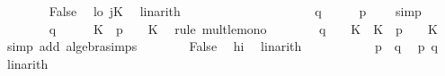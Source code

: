 \begin{isabellebody}
\ \ \ \ \ \ \isamarkupfalse%
\ False\ \isamarkupfalse%
\ lo\ jK\ \isamarkupfalse%
\ linarith\isanewline
\ \ \ \ \isamarkupfalse%
\isanewline
\ \ \ \ \ \ \isamarkupfalse%
\ {}\isanewline
\ \ \ \ \ \ \isamarkupfalse%
\ {\isachardoublequoteopen}{\isacharparenleft}{\kern0pt}q\ {\isacharminus}{\kern0pt}\ {}{\isacharparenright}{\kern0pt}\ {\isacharplus}{\kern0pt}\ {}\ {\isasymle}\ p\ {\isacharminus}{\kern0pt}\ {}{\isachardoublequoteclose}\ \isamarkupfalse%
\ simp\isanewline
\ \ \ \ \ \ \isamarkupfalse%
\ {\isachardoublequoteopen}{\isacharparenleft}{\kern0pt}{\isacharparenleft}{\kern0pt}q\ {\isacharminus}{\kern0pt}\ {}{\isacharparenright}{\kern0pt}\ {\isacharplus}{\kern0pt}\ {}{\isacharparenright}{\kern0pt}\ {\isacharasterisk}{\kern0pt}\ K\ {\isasymle}\ {\isacharparenleft}{\kern0pt}p\ {\isacharminus}{\kern0pt}\ {}{\isacharparenright}{\kern0pt}\ {\isacharasterisk}{\kern0pt}\ K{\isachardoublequoteclose}\ \isamarkupfalse%
\ {\isacharparenleft}{\kern0pt}rule\ mult{\isacharunderscore}{\kern0pt}le{\isacharunderscore}{\kern0pt}mono{}{\isacharparenright}{\kern0pt}\isanewline
\ \ \ \ \ \ \isamarkupfalse%
\ {\isachardoublequoteopen}{\isacharparenleft}{\kern0pt}q\ {\isacharminus}{\kern0pt}\ {}{\isacharparenright}{\kern0pt}\ {\isacharasterisk}{\kern0pt}\ K\ {\isacharplus}{\kern0pt}\ K\ {\isasymle}\ {\isacharparenleft}{\kern0pt}p\ {\isacharminus}{\kern0pt}\ {}{\isacharparenright}{\kern0pt}\ {\isacharasterisk}{\kern0pt}\ K{\isachardoublequoteclose}\ \isamarkupfalse%
\ {\isacharparenleft}{\kern0pt}simp\ add{\isacharcolon}{\kern0pt}\ algebra{\isacharunderscore}{\kern0pt}simps{\isacharparenright}{\kern0pt}\isanewline
\ \ \ \ \ \ \isamarkupfalse%
\ False\ \isamarkupfalse%
\ hi\ \isamarkupfalse%
\ linarith\isanewline
\ \ \ \ \isamarkupfalse%
\isanewline
\ \ \isamarkupfalse%
\isanewline
\ \ \isamarkupfalse%
\ {\isachardoublequoteopen}p\ {\isacharequal}{\kern0pt}\ q{\isachardoublequoteclose}\ \isamarkupfalse%
\ p{}\ q{}\ \isamarkupfalse%
\ linarith\isanewline
{}\isamarkupfalse%
%
\endisatagproof
{\isafoldproof}%
%
\isadelimproof
%
\endisadelimproof
%

\end{isabellebody}
